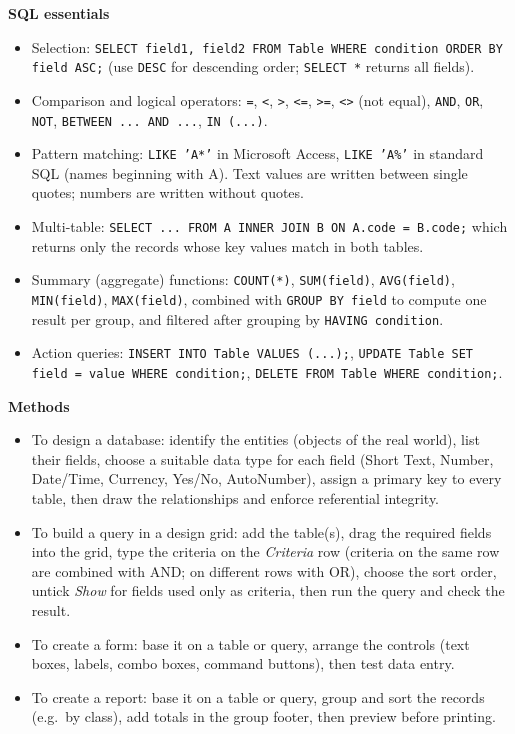 \documentclass[11pt]{article}
\begin{document}
\begin{bilan}
\textbf{SQL essentials}
\begin{itemize}
\item Selection: \texttt{SELECT field1, field2 FROM Table WHERE condition ORDER BY field ASC;} (use \texttt{DESC} for descending order; \texttt{SELECT *} returns all fields).
\item Comparison and logical operators: \texttt{=}, \texttt{<}, \texttt{>}, \texttt{<=}, \texttt{>=}, \texttt{<>} (not equal), \texttt{AND}, \texttt{OR}, \texttt{NOT}, \texttt{BETWEEN ... AND ...}, \texttt{IN (...)}.
\item Pattern matching: \texttt{LIKE 'A*'} in Microsoft Access, \texttt{LIKE 'A\%'} in standard SQL (names beginning with A). Text values are written between single quotes; numbers are written without quotes.
\item Multi-table: \texttt{SELECT ... FROM A INNER JOIN B ON A.code = B.code;} which returns only the records whose key values match in both tables.
\item Summary (aggregate) functions: \texttt{COUNT(*)}, \texttt{SUM(field)}, \texttt{AVG(field)}, \texttt{MIN(field)}, \texttt{MAX(field)}, combined with \texttt{GROUP BY field} to compute one result per group, and filtered after grouping by \texttt{HAVING condition}.
\item Action queries: \texttt{INSERT INTO Table VALUES (...);}, \texttt{UPDATE Table SET field = value WHERE condition;}, \texttt{DELETE FROM Table WHERE condition;}.
\end{itemize}

\textbf{Methods}
\begin{itemize}
\item To design a database: identify the entities (objects of the real world), list their fields, choose a suitable data type for each field (Short Text, Number, Date/Time, Currency, Yes/No, AutoNumber), assign a primary key to every table, then draw the relationships and enforce referential integrity.
\item To build a query in a design grid: add the table(s), drag the required fields into the grid, type the criteria on the \emph{Criteria} row (criteria on the same row are combined with AND; on different rows with OR), choose the sort order, untick \emph{Show} for fields used only as criteria, then run the query and check the result.
\item To create a form: base it on a table or query, arrange the controls (text boxes, labels, combo boxes, command buttons), then test data entry.
\item To create a report: base it on a table or query, group and sort the records (e.g.\ by class), add totals in the group footer, then preview before printing.
\end{itemize}


\end{bilan}
\end{document}
